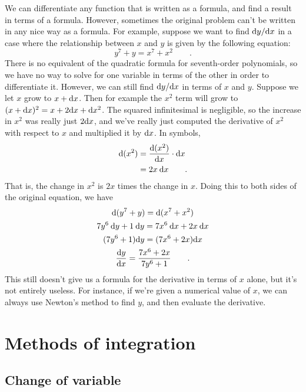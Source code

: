 We can differentiate any function that is written as a formula,
and find a result in terms of a formula. However, sometimes the
original problem can't be written in any nice way as a formula.
For example, suppose we want to find $\textup{d} y/\textup{d} x$ in a case
where the relationship between $x$
and $y$ is given by the following equation:
\begin{equation*}
  y^7+y = x^7+x^2 \qquad .
\end{equation*}
There is no equivalent of the quadratic formula for seventh-order
polynomials, so we have no way to solve for one variable in terms
of the other in order to differentiate it. However, we can still
find $\textup{d} y/\textup{d} x$ in terms of $x$ and $y$. Suppose we let $x$
grow to $x+\textup{d} x$. Then for example the $x^2$ term will grow
to $(x+\textup{d} x)^2=x+2\textup{d} x+\textup{d} x^2$. The squared infinitesimal
is negligible, so the increase in $x^2$ was really just
$2\textup{d} x$, and we've really just computed the derivative of
$x^2$ with respect to $x$ and multiplied it by $\textup{d} x$. In
symbols,
\begin{align*}
  \textup{d}(x^2) &= \frac{\textup{d}(x^2)}{\textup{d} x} \cdot \textup{d} x \\
           &= 2x \: \textup{d} x \qquad .
\end{align*}
That is, the change in $x^2$ is $2x$ times the change in $x$.
Doing this to both sides of the original equation, we have
\begin{gather*}
  \textup{d}(y^7+y) = \textup{d}(x^7+x^2)\\
  7y^6\:\textup{d} y + 1\:\textup{d} y = 7x^6\:\textup{d} x + 2x\:\textup{d} x\\
  (7y^6+1)\textup{d} y = (7x^6+2x)\textup{d} x \\
  \frac{\textup{d} y}{\textup{d} x} = \frac{7x^6+2x}{7y^6+1} \qquad .
\end{gather*}
This still doesn't give us a formula for the derivative in
terms of $x$ alone, but it's not entirely useless. For instance,
if we're given a numerical value of $x$, we can always use
Newton's method to find $y$, and then
evaluate the derivative.

\section{Methods of integration}

\subsection{Change of variable}

